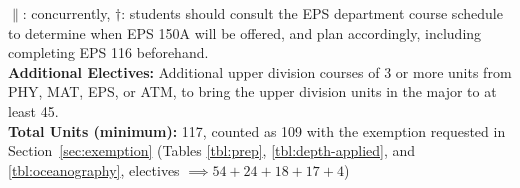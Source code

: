 \documentclass[12pt]{article}
\begin{document}
\noindent
$\parallel$: concurrently, $\dagger$: students should consult the EPS
department course schedule to determine when EPS 150A will be offered,
and plan accordingly, including completing EPS 116 beforehand.\\
{\bf Additional Electives:} Additional upper division courses of 3 or more units from PHY, MAT, EPS, or ATM, to bring the upper division units in the major to at least 45.\\
{\bf Total Units (minimum):} 117, counted as 109 with the exemption requested in Section~\ref{sec:exemption}
(Tables \ref{tbl:prep}, \ref{tbl:depth-applied}, and \ref{tbl:oceanography}, electives $\implies 54+24+18+17+4$) \\   

\end{document}
